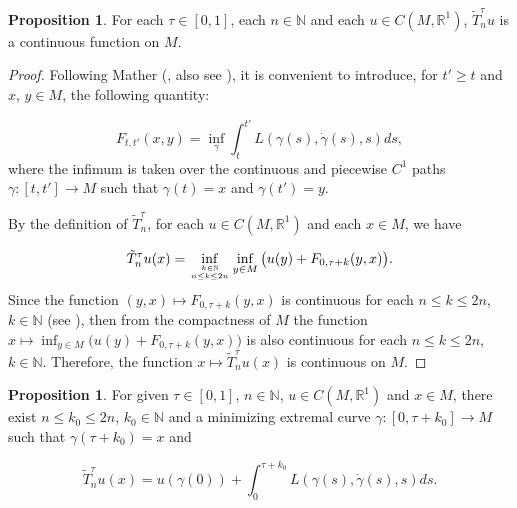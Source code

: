 \documentclass{amsart}[12pt]
\theoremstyle{definition}
\newtheorem{proposition}[theorem]{Proposition}
\theoremstyle{remark}
\numberwithin{equation}{section}
\begin{document}
\begin{proposition}\label{pr3-1}
For each $\tau\in[0,1]$, each $n\in \mathbb{N}$ and each $u\in
C(M,\mathbb{R}^1)$, $\tilde{T}_n^\tau u$ is a continuous function
on $M$.
\end{proposition}

\begin{proof}
Following Mather (\cite{Mat93}, also see \cite{Ber}), it is
convenient to introduce, for $t'\geq t$ and $x$, $y\in M$, the
following quantity:

\[
F_{t,t'}(x,y)=\inf_\gamma\int_t^{t'}L(\gamma(s),\dot{\gamma}(s),s)ds,
\]
where the infimum is taken over the continuous and piecewise $C^1$
paths $\gamma:[t,t']\to M$ such that $\gamma(t)=x$ and
$\gamma(t')=y$.

By the definition of $\tilde{T}_n^\tau$, for each $u\in
C(M,\mathbb{R}^1)$ and each $x\in M$, we have

\begin{align*}
\tilde{T}_n^\tau u(x)=\inf_{k\in\mathbb{N} \atop n\leq k\leq
                       2n}\inf_{y\in M}\big(u(y)+F_{0,\tau+k}(y,x)\big).
\end{align*}
Since the function $(y,x)\mapsto F_{0,\tau+k}(y,x)$ is continuous
for each $n\leq k\leq 2n$, $k\in\mathbb{N}$ (see \cite{Ber}), then
from the compactness of $M$ the function $x\mapsto \inf_{y\in
M}\big(u(y)+F_{0,\tau+k}(y,x)\big)$ is also continuous for each
$n\leq k\leq 2n$, $k\in\mathbb{N}$. Therefore, the function
$x\mapsto\tilde{T}_n^\tau u(x)$ is continuous on $M$.
\end{proof}

\begin{proposition}\label{pr3-2}
For given $\tau\in[0,1]$, $n\in\mathbb{N}$, $u\in
C(M,\mathbb{R}^1)$ and $x\in M$, there exist $n\leq k_0\leq2n$,
$k_0\in\mathbb{N}$ and a minimizing extremal curve
$\gamma:[0,\tau+k_0]\to M$ such that $\gamma(\tau+k_0)=x$ and

\[
\tilde{T}_n^\tau u(x)=u(\gamma(0))+\int_{0}^{\tau+k_0}
L(\gamma(s),\dot{\gamma}(s),s)ds.
\]
\end{proposition}
\end{document}
